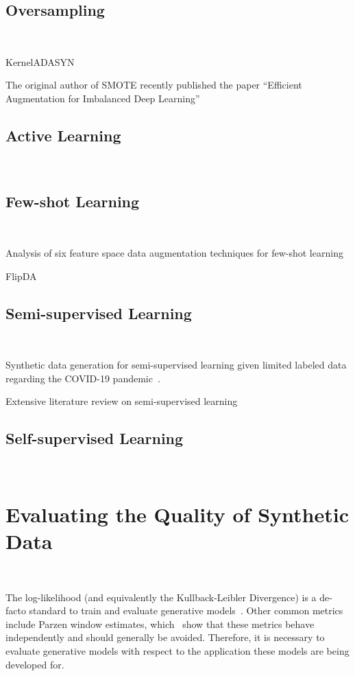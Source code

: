 \documentclass[parskip=full]{scrartcl}
\begin{document}
\subsection{Oversampling}~\label{sec:oversampling}

KernelADASYN~\cite{tang2015kerneladasyn}

The original author of SMOTE recently published the paper ``Efficient Augmentation for Imbalanced Deep
Learning''~\cite{dablain2022efficient}

\subsection{Active Learning}~\label{sec:active-learning}

\subsection{Few-shot Learning}~\label{sec:few-shot-learning}

Analysis of six feature space data augmentation techniques for few-shot
learning~\cite{kumar2019closer}

FlipDA~\cite{zhou2021flipda}

\subsection{Semi-supervised Learning}~\label{sec:semi-supervised-learning}

Synthetic data generation for semi-supervised learning given limited labeled
data regarding the COVID-19 pandemic~\cite{das2022conditional}.

Extensive literature review on semi-supervised learning~\cite{van2020survey}

\subsection{Self-supervised Learning}~\label{sec:self-supervised-learning}

\section{Evaluating the Quality of Synthetic Data
}~\label{sec:evaluating-synthetic-data}

The log-likelihood (and equivalently the Kullback-Leibler Divergence) is a
de-facto standard to train and evaluate generative
models~\cite{theis2016note}. Other common metrics include Parzen window
estimates, which~\citet{theis2016note} show that these metrics behave
independently and should generally be avoided. Therefore, it is necessary
to evaluate generative models with respect to the application these models are
being developed for.
\end{document}
